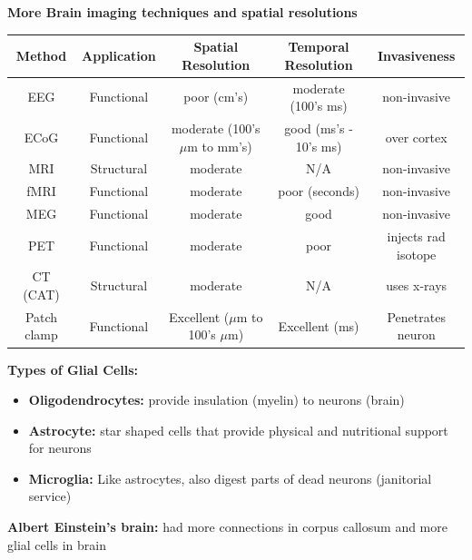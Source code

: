 \documentclass{article}
\begin{document}
\noindent\textbf{More Brain imaging techniques and spatial resolutions}\\
\begin{tabularx}{\textwidth}{|c|c|c|c|c|}
    \hline
    Method & Application & Spatial Resolution & Temporal Resolution & Invasiveness  \\
    \hline
    EEG & Functional & poor (cm's) & moderate (100's ms) & non-invasive \\
    ECoG & Functional & moderate (100's $\mu$m to mm's) & good (ms's - 10's ms) & over cortex\\
    MRI & Structural & moderate & N/A & non-invasive \\
    fMRI & Functional & moderate & poor (seconds) & non-invasive \\
    MEG & Functional & moderate & good & non-invasive \\
    PET & Functional & moderate & poor & injects rad isotope \\
    CT (CAT) & Structural & moderate & N/A & uses x-rays\\
    Patch clamp & Functional & Excellent ($\mu$m to 100's $\mu$m) & Excellent (ms) & Penetrates neuron\\
    \hline
\end{tabularx}
\bigskip

\noindent\textbf{Types of Glial Cells:}
\begin{itemize}
    \item \textbf{Oligodendrocytes:} provide insulation (myelin) to neurons (brain) 
    \item \textbf{Astrocyte:} star shaped cells that provide physical and nutritional support for neurons
    \item \textbf{Microglia:} Like astrocytes, also digest parts of dead neurons (janitorial service) 
\end{itemize}

\nondent \textbf{Albert Einstein's brain:} had more connections in corpus callosum and more glial cells in brain 
\end{document}
